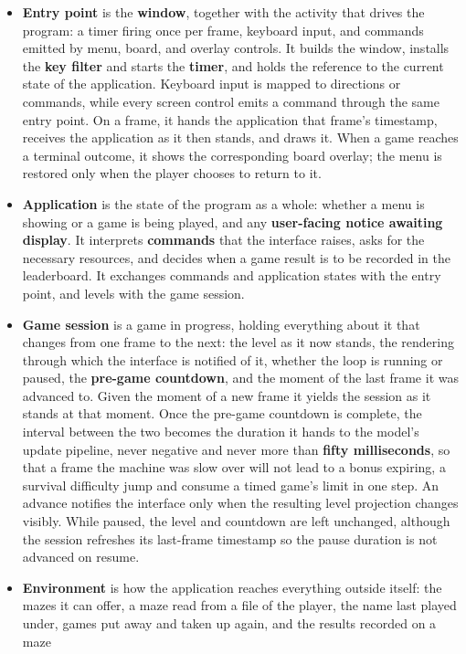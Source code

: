 \begin{itemize}
  \item \textbf{Entry point} is the \textbf{window}, together with the activity that drives the program: a timer
  firing once per frame, keyboard input, and commands emitted by menu, board, and overlay controls. It builds the
  window, installs the \textbf{key filter} and starts the \textbf{timer}, and holds the reference to the current
  state of the application. Keyboard input is mapped to directions or commands, while every screen control emits a
  command through the same entry point. On a frame, it hands the application that frame's timestamp, receives the
  application as it then stands, and draws it. When a game reaches a terminal outcome, it shows the corresponding
  board overlay; the menu is restored only when the player chooses to return to it.
  \item \textbf{Application} is the state of the program as a whole: whether a menu is showing or a game is being played,
  and any \textbf{user-facing notice awaiting display}. It interprets \textbf{commands} that the interface raises, asks for the
  necessary resources, and decides when a game result is to be recorded in the leaderboard. It exchanges commands and
  application states with the entry point, and levels with the game session.
  \item \textbf{Game session} is a game in progress, holding everything about it that changes from one frame to the next:
  the level as it now stands, the rendering through which the interface is notified of it, whether the loop
  is running or paused, the \textbf{pre-game countdown}, and the moment of the last frame it was advanced to. Given the moment of a new frame
  it yields the session as it stands at that moment. Once the pre-game countdown is complete, the interval between the two becomes the duration it
  hands to the model's update pipeline, never negative and never more than \textbf{fifty milliseconds}, so that a frame
  the machine was slow over will not lead to a bonus expiring, a survival difficulty jump and consume a timed game's limit
  in one step.
  An advance notifies the interface only when the resulting level projection changes visibly. While paused, the level
  and countdown are left unchanged, although the session refreshes its last-frame timestamp so the pause duration is
  not advanced on resume.
  \item \textbf{Environment} is how the application reaches everything outside itself: the mazes it can offer, a maze read from
  a file of the player, the name last played under, games put away and taken up again, and the results recorded on a maze

\end{itemize}
